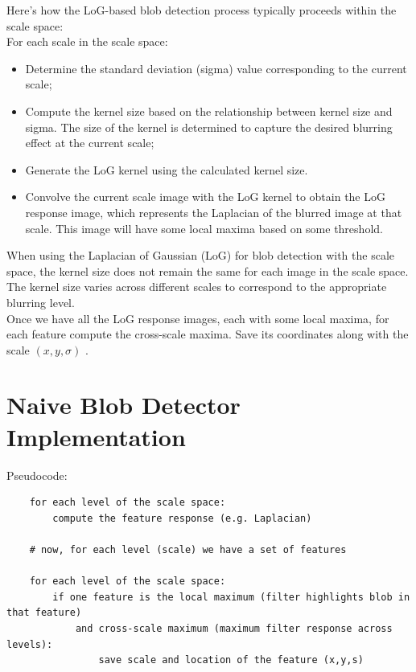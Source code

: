 \documentclass{article}
\begin{document}

Here's how the LoG-based blob detection process typically proceeds within the scale space: \\

For each scale in the scale space:
\begin{itemize}
    \item Determine the standard deviation (sigma) value corresponding to the current scale;
    \item Compute the kernel size based on the relationship between kernel size and sigma. The size of the kernel is determined to capture the desired blurring effect at the current scale;
    \item Generate the LoG kernel using the calculated kernel size.
    \item Convolve the current scale image with the LoG kernel to obtain the LoG response image, which represents the Laplacian of the blurred image at that scale. This image will have some local maxima based on some threshold.
\end{itemize}

When using the Laplacian of Gaussian (LoG) for blob detection with the scale space, the kernel size does not remain the same for each image in the scale space. The kernel size varies across different scales to correspond to the appropriate blurring level.\\

Once we have all the LoG response images, each with some local maxima, for each feature compute the cross-scale maxima. Save its coordinates along with the scale $(x, y, \sigma)$ .

\section*{Naive Blob Detector Implementation}

Pseudocode:
\begin{verbatim}
    for each level of the scale space:
        compute the feature response (e.g. Laplacian)

    # now, for each level (scale) we have a set of features 

    for each level of the scale space:
        if one feature is the local maximum (filter highlights blob in that feature) 
            and cross-scale maximum (maximum filter response across levels):
                save scale and location of the feature (x,y,s)
    
\end{verbatim}
\end{document}

